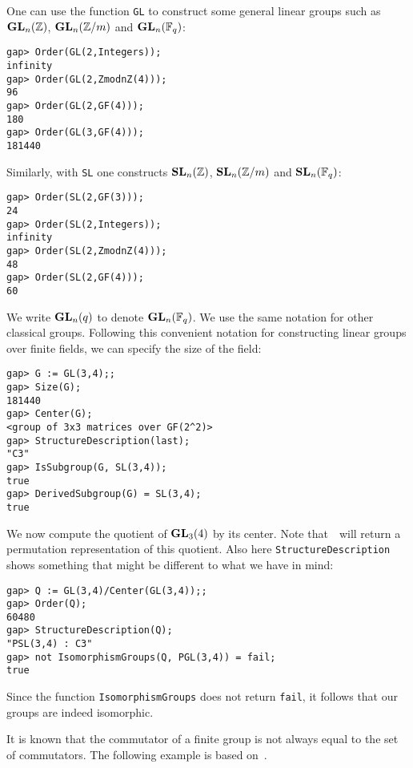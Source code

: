\begin{example}
One can use the function \lstinline{GL} to construct some general linear groups such as
$\mathbf{GL}_n(\mathbb{Z})$, $\mathbf{GL}_n(\mathbb{Z}/m)$ and $\mathbf{GL}_n(\mathbb{F}_q)$:
\begin{lstlisting}
gap> Order(GL(2,Integers));
infinity
gap> Order(GL(2,ZmodnZ(4)));
96
gap> Order(GL(2,GF(4)));
180
gap> Order(GL(3,GF(4)));
181440
\end{lstlisting}
Similarly, with \lstinline{SL} one constructs 
$\mathbf{SL}_n(\mathbb{Z})$, $\mathbf{SL}_n(\mathbb{Z}/m)$ and 
$\mathbf{SL}_n(\mathbb{F}_q)$:
\begin{lstlisting}
gap> Order(SL(2,GF(3)));
24
gap> Order(SL(2,Integers));
infinity
gap> Order(SL(2,ZmodnZ(4)));
48
gap> Order(SL(2,GF(4)));
60
\end{lstlisting}

We write $\mathbf{GL}_n(q)$ to denote $\mathbf{GL}_n(\mathbb{F}_q)$. We use
the same notation for other classical groups. Following 
this convenient notation for constructing 
linear groups over finite fields, 
we can specify the size of the field:
\begin{lstlisting}
gap> G := GL(3,4);;
gap> Size(G);
181440
gap> Center(G);
<group of 3x3 matrices over GF(2^2)>
gap> StructureDescription(last);
"C3"
gap> IsSubgroup(G, SL(3,4));
true
gap> DerivedSubgroup(G) = SL(3,4);
true
\end{lstlisting}
We now compute 
the quotient of $\mathbf{GL}_3(4)$ by its center. Note that~\GAP~will return
a permutation representation of this quotient. Also here 
\lstinline{StructureDescription} shows something that might be
different to what we have in mind:
\begin{lstlisting}
gap> Q := GL(3,4)/Center(GL(3,4));;
gap> Order(Q);
60480
gap> StructureDescription(Q);
"PSL(3,4) : C3"
gap> not IsomorphismGroups(Q, PGL(3,4)) = fail;
true
\end{lstlisting}
Since the function \lstinline{IsomorphismGroups} does not 
return \lstinline{fail}, it follows that
our groups are indeed isomorphic. 
\end{example}

It is known that the commutator of a finite group is not always equal to the
set of commutators.  The following example is based on~\cite{MR0075938}. 


